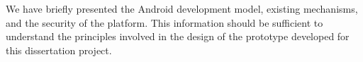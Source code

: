 We have briefly presented the Android development model, existing mechanisms, and the security of the platform. This information should be sufficient to understand the principles involved in the design of the prototype developed for this dissertation project.
